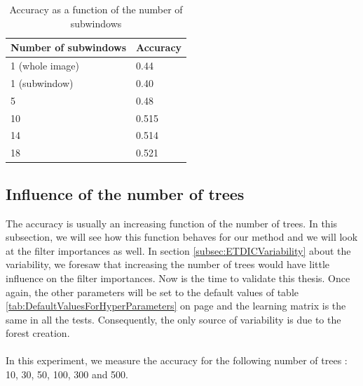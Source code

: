\documentclass[a4paper]{report}
\begin{document}
		\begin{table}
			\centering
				\begin{tabular}{l|l}
				\hline
				Number of subwindows & Accuracy \\
				\hline \hline
				1 (whole image) & 0.44\\
				1 (subwindow) & 0.40 \\
				5 & 0.48 \\
				10 & 0.515 \\
				14 &  0.514\\
				18 &  0.521 \\
				\hline
				
				\end{tabular}
			\caption{\label{tab:AccFNbSW}Accuracy as a function of the number of subwindows}
		\end{table}
		
		
		\subsection{Influence of the number of trees}
		The accuracy is usually an increasing function of the number of trees. In this subsection, we will see how this function behaves for our method and we will look at the filter importances as well. In section \ref{subsec:ETDICVariability} about the variability, we foresaw that increasing the number of trees would have little influence on the filter importances. Now is the time to validate this thesis. Once again, the other parameters will be set to the default values of table \ref{tab:DefaultValuesForHyperParameters} on page \pageref{tab:DefaultValuesForHyperParameters} and the learning matrix is the same in all the tests. Consequently, the only source of variability is due to the forest creation.
		\paragraph{}
		In this experiment, we measure the accuracy for the following number of trees : 10, 30, 50, 100, 300 and 500. 
		
\end{document}
